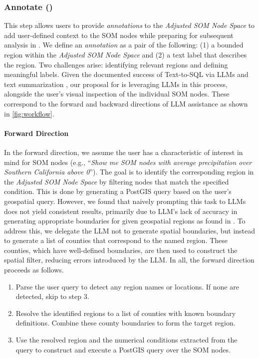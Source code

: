 \subsubsection{Annotate ()}\label{ssec:annotate}
This step allows users to provide \textit{annotations} to the \textit{Adjusted SOM Node Space} to add user-defined context to the SOM nodes while preparing for subsequent analysis in .
%
We define an \textit{annotation} as a pair of the following: (1) a bounded region within the \textit{Adjusted SOM Node Space} and (2) a text label that describes the region.
%
Two challenges arise: identifying relevant regions and defining meaningful labels.
%
Given the documented success of Text-to-SQL via LLMs \cite{zhang_natural_2024} and text summarization \cite{pu_summarization_2023}, our proposal for \ClimateSOM is leveraging LLMs in this process, alongside the user's visual inspection of the individual SOM nodes.
%
These correspond to the forward and backward directions of LLM assistance as shown in \cref{fig:workflow}.


\paragraph{Forward Direction}
In the forward direction, we assume the user has a characteristic of interest in mind for SOM nodes (e.g., ``\textit{Show me SOM nodes with average precipitation over Southern California above 0}''). The goal is to identify the corresponding region in the \textit{Adjusted SOM Node Space} by filtering nodes that match the specified condition. This is done by generating a PostGIS query based on the user’s geospatial query.
%
However, we found that naively prompting this task to LLMs does not yield consistent results, primarily due to LLM's
lack of accuracy in generating appropriate boundaries for given geospatial regions as found in \cite{liu_nalspatial_2025}.
%
To address this, we delegate the LLM not to generate spatial boundaries, but instead to generate a list of counties that correspond to the named region. These counties, which have well-defined boundaries, are then used to construct the spatial filter, reducing errors introduced by the LLM.
%
%
In all, the forward direction proceeds as follows.
\begin{enumerate}[nolistsep]
    \item Parse the user query to detect any region names or locations. If none are detected, skip to step 3.
    \item Resolve the identified regions to a list of counties with known boundary definitions. Combine these county boundaries to form the target region.
    \item Use the resolved region and the numerical conditions extracted from the query to construct and execute a PostGIS query over the SOM nodes.
\end{enumerate}
